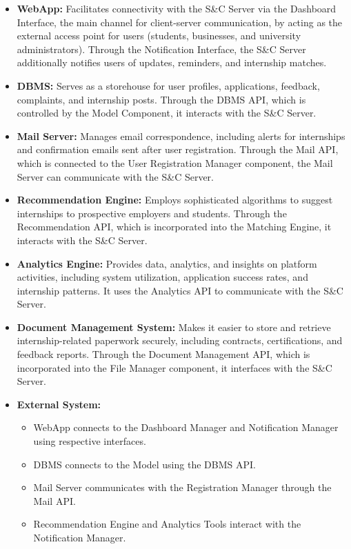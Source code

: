 \begin{itemize}
    \item \textbf{WebApp:} Facilitates connectivity with the S\&C Server via the Dashboard Interface, the main channel for client-server communication, by acting as the external access point for users (students, businesses, and university administrators). Through the Notification Interface, the S\&C Server additionally notifies users of updates, reminders, and internship matches.
    \item \textbf{DBMS:} Serves as a storehouse for user profiles, applications, feedback, complaints, and internship posts. Through the DBMS API, which is controlled by the Model Component, it interacts with the S\&C Server.
    \item \textbf{Mail Server:} Manages email correspondence, including alerts for internships and confirmation emails sent after user registration. Through the Mail API, which is connected to the User Registration Manager component, the Mail Server can communicate with the S\&C Server.
    \item
    \textbf{Recommendation Engine:} Employs sophisticated algorithms to suggest internships to prospective employers and students. Through the Recommendation API, which is incorporated into the Matching Engine, it interacts with the S\&C Server.
    \item \textbf{Analytics Engine:} Provides data, analytics, and insights on platform activities, including system utilization, application success rates, and internship patterns. It uses the Analytics API to communicate with the S\&C Server.
    \item \textbf{Document Management System:} Makes it easier to store and retrieve internship-related paperwork securely, including contracts, certifications, and feedback reports. Through the Document Management API, which is incorporated into the File Manager component, it interfaces with the S\&C Server.

    \item \textbf{External System:}
    \begin{itemize}
    \item WebApp connects to the Dashboard Manager and Notification Manager using respective interfaces.
    \item DBMS connects to the Model using the DBMS API.
    \item Mail Server communicates with the Registration Manager through the Mail API.
    \item Recommendation Engine and Analytics Tools interact with the Notification Manager.
    \end{itemize}


\end{itemize}
